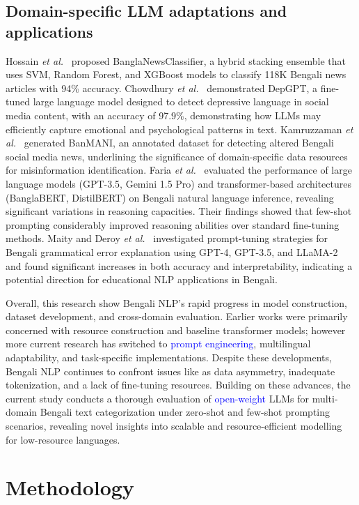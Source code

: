 \documentclass[10pt,letterpaper]{article}
\newcommand{\rev}[1]{\textcolor{blue}{#1}}
\begin{document}
\subsection*{Domain-specific LLM adaptations and applications}

Hossain \textit{et al.}~\cite{b26} proposed BanglaNewsClassifier, a hybrid stacking ensemble that uses SVM, Random Forest, and XGBoost models to classify 118K Bengali news articles with 94\% accuracy. Chowdhury \textit{et al.}~\cite{b27} demonstrated DepGPT, a fine-tuned large language model designed to detect depressive language in social media content, with an accuracy of 97.9\%, demonstrating how LLMs may efficiently capture emotional and psychological patterns in text. Kamruzzaman \textit{et al.}~\cite{b28} generated BanMANI, an annotated dataset for detecting altered Bengali social media news, underlining the significance of domain-specific data resources for misinformation identification. Faria \textit{et al.}~\cite{b29} evaluated the performance of large language models (GPT-3.5, Gemini 1.5 Pro) and transformer-based architectures (BanglaBERT, DistilBERT) on Bengali natural language inference, revealing significant variations in reasoning capacities. Their findings showed that few-shot prompting considerably improved reasoning abilities over standard fine-tuning methods. Maity and Deroy \textit{et al.}~\cite{b30} investigated prompt-tuning strategies for Bengali grammatical error explanation using GPT-4, GPT-3.5, and LLaMA-2 and found significant increases in both accuracy and interpretability, indicating a potential direction for educational NLP applications in Bengali.

\noindent Overall, this research show Bengali NLP's rapid progress in model construction, dataset development, and cross-domain evaluation. Earlier works were primarily concerned with resource construction and baseline transformer models; however more current research has switched to \rev{prompt engineering}, multilingual adaptability, and task-specific implementations. Despite these developments, Bengali NLP continues to confront issues like as data asymmetry, inadequate tokenization, and a lack of fine-tuning resources. Building on these advances, the current study conducts a thorough evaluation of \rev{open-weight} LLMs for multi-domain Bengali text categorization under zero-shot and few-shot prompting scenarios, revealing novel insights into scalable and resource-efficient modelling for low-resource languages.

\section*{Methodology}
\label{sec:methodology}
\end{document}
